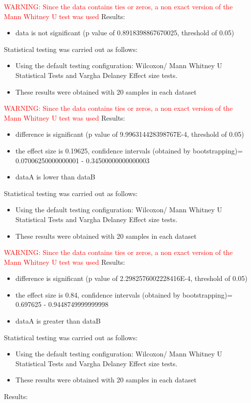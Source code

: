 \documentclass[]{article}
\begin{document}
\textcolor{Red}{WARNING: Since the data contains ties or zeros, a non exact version of the Mann Whitney U test was used}
Results:
\begin{itemize}
\item{data is not significant (p value of 0.8918398867670025, threshold of 0.05)}
\end{itemize}Statistical testing was carried out as follows: \begin{itemize}
\item{Using the default testing configuration: Wilcoxon/ Mann Whitney U Statistical Tests and Vargha Delaney Effect size tests.}
\item{These results were obtained with 20 samples in each dataset}
\end{itemize}
\textcolor{Red}{WARNING: Since the data contains ties or zeros, a non exact version of the Mann Whitney U test was used}
Results:
\begin{itemize}
\item{difference is significant (p value of 9.996314428398767E-4, threshold of 0.05)}
\item{the effect size is 0.19625, confidence intervals (obtained by bootstrapping)= 0.07006250000000001 - 0.34500000000000003}
\item{dataA is lower than dataB}
\end{itemize}Statistical testing was carried out as follows: \begin{itemize}
\item{Using the default testing configuration: Wilcoxon/ Mann Whitney U Statistical Tests and Vargha Delaney Effect size tests.}
\item{These results were obtained with 20 samples in each dataset}
\end{itemize}
\textcolor{Red}{WARNING: Since the data contains ties or zeros, a non exact version of the Mann Whitney U test was used}
Results:
\begin{itemize}
\item{difference is significant (p value of 2.2982576002228416E-4, threshold of 0.05)}
\item{the effect size is 0.84, confidence intervals (obtained by bootstrapping)= 0.697625 - 0.9448749999999998}
\item{dataA is greater than dataB}
\end{itemize}Statistical testing was carried out as follows: \begin{itemize}
\item{Using the default testing configuration: Wilcoxon/ Mann Whitney U Statistical Tests and Vargha Delaney Effect size tests.}
\item{These results were obtained with 20 samples in each dataset}
\end{itemize}Results:
\end{document}
